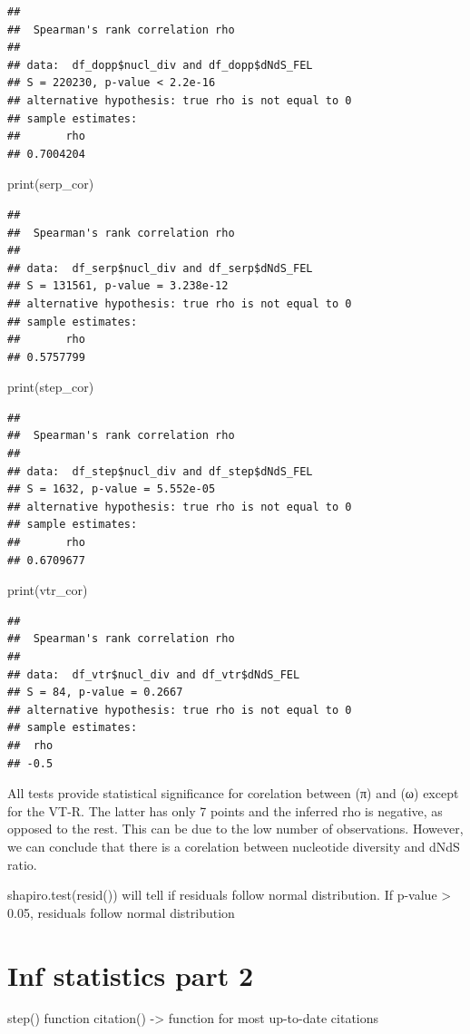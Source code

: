 \documentclass[
]{article}
\newenvironment{Shaded}{\begin{snugshade}}{\end{snugshade}}
\newcommand{\FunctionTok}[1]{\textcolor[rgb]{0.00,0.00,0.00}{#1}}
\newcommand{\NormalTok}[1]{#1}
\begin{document}
\begin{verbatim}
## 
##  Spearman's rank correlation rho
## 
## data:  df_dopp$nucl_div and df_dopp$dNdS_FEL
## S = 220230, p-value < 2.2e-16
## alternative hypothesis: true rho is not equal to 0
## sample estimates:
##       rho 
## 0.7004204
\end{verbatim}

\begin{Shaded}
\begin{Highlighting}[]
\FunctionTok{print}\NormalTok{(serp\_cor)}
\end{Highlighting}
\end{Shaded}

\begin{verbatim}
## 
##  Spearman's rank correlation rho
## 
## data:  df_serp$nucl_div and df_serp$dNdS_FEL
## S = 131561, p-value = 3.238e-12
## alternative hypothesis: true rho is not equal to 0
## sample estimates:
##       rho 
## 0.5757799
\end{verbatim}

\begin{Shaded}
\begin{Highlighting}[]
\FunctionTok{print}\NormalTok{(step\_cor)}
\end{Highlighting}
\end{Shaded}

\begin{verbatim}
## 
##  Spearman's rank correlation rho
## 
## data:  df_step$nucl_div and df_step$dNdS_FEL
## S = 1632, p-value = 5.552e-05
## alternative hypothesis: true rho is not equal to 0
## sample estimates:
##       rho 
## 0.6709677
\end{verbatim}

\begin{Shaded}
\begin{Highlighting}[]
\FunctionTok{print}\NormalTok{(vtr\_cor)}
\end{Highlighting}
\end{Shaded}

\begin{verbatim}
## 
##  Spearman's rank correlation rho
## 
## data:  df_vtr$nucl_div and df_vtr$dNdS_FEL
## S = 84, p-value = 0.2667
## alternative hypothesis: true rho is not equal to 0
## sample estimates:
##  rho 
## -0.5
\end{verbatim}

All tests provide statistical significance for corelation between (π)
and (ω) except for the VT-R. The latter has only 7 points and the
inferred rho is negative, as opposed to the rest. This can be due to the
low number of observations. However, we can conclude that there is a
corelation between nucleotide diversity and dNdS ratio.

shapiro.test(resid()) will tell if residuals follow normal distribution.
If p-value \textgreater{} 0.05, residuals follow normal distribution

\hypertarget{inf-statistics-part-2}{%
\section{Inf statistics part 2}\label{inf-statistics-part-2}}

step() function citation() -\textgreater{} function for most up-to-date
citations
\end{document}
